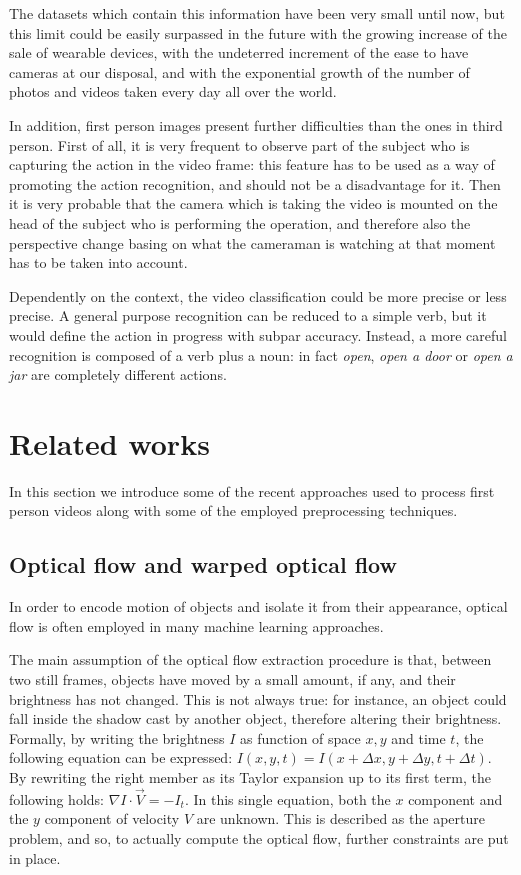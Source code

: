 \documentclass[10pt,twocolumn,letterpaper]{article}
\begin{document}
The datasets which contain this information have been very small until now, but this limit could be easily surpassed in the future with the growing increase of the sale of wearable devices, with the undeterred increment of the ease to have cameras at our disposal, and with the exponential growth of the number of photos and videos taken every day all over the world. 

In addition, first person images present further difficulties than the ones in third person. First of all, it is very frequent to observe part of the subject who is capturing the action in the video frame: this feature has to be used as a way of promoting the action recognition, and should not be a disadvantage for it. Then it is very probable that the camera which is taking the video is mounted on the head of the subject who is performing the operation, and therefore also the perspective change basing on what the cameraman is watching at that moment has to be taken into account.

Dependently on the context, the video classification could be more precise or less precise. A general purpose recognition can be reduced to a simple verb, but it would define the action in progress with subpar accuracy. Instead, a more careful recognition is composed of a verb plus a noun: in fact \emph{open}, \emph{open a door} or \emph{open a jar} are completely different actions.

\section{Related works}

In this section we introduce some of the recent approaches used to process first person videos along with some of the employed preprocessing techniques.

\subsection{Optical flow and warped optical flow}

In order to encode motion of objects and isolate it from their appearance, optical flow is often employed in many machine learning approaches.

The main assumption of the optical flow extraction procedure is that, between two still frames, objects have moved by a small amount, if any, and their brightness has not changed. This is not always true: for instance, an object could fall inside the shadow cast by another object, therefore altering their brightness. Formally, by writing the brightness $I$ as function of space $x,y$ and time $t$, the following equation can be expressed:
${I(x,y,t) = I(x + \Delta x, y + \Delta y, t + \Delta t)}$. By rewriting the right member as its Taylor expansion up to its first term, the following holds: $\nabla I \cdot \vec{V} = -I_t$. In this single equation, both the $x$ component and the $y$ component of velocity $V$ are unknown. This is described as the aperture problem, and so, to actually compute the optical flow, further constraints are put in place.
\end{document}

